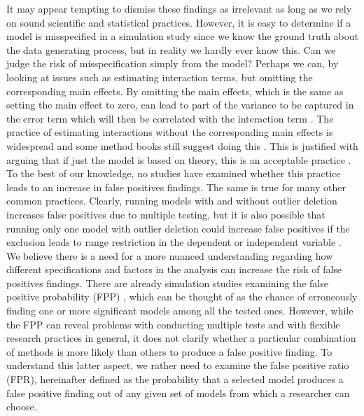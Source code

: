 It may appear tempting to dismiss these findings as irrelevant as long as we rely on sound scientific and statistical practices. However, it is easy to determine if a model is misspecified in a simulation study since we know the ground truth about the data generating process, but in reality we hardly ever know this. Can we judge the risk of misspecification simply from the model? Perhaps we can, by looking at issues such as estimating interaction terms, but omitting the corresponding main effects. By omitting the main effects, which is the same as setting the main effect to zero, can lead to part of the variance to be captured in the error term which will then be correlated with the interaction term \citep{Branbor2006}. The practice of estimating interactions without the corresponding main effects is widespread \citep{Branbor2006} and some method books still suggest doing this \citep{Cleves2008}. This is justified with arguing that if just the model is based on theory, this is an acceptable practice \citep{aiken1991multiple}. To the best of our knowledge, no studies have examined whether this practice leads to an increase in false positives findings. The same is true for many other common practices. Clearly, running models with and without outlier deletion increases false positives due to multiple testing, but it is also possible that running only one model with outlier deletion could increase false positives if the exclusion leads to range restriction in the dependent or independent variable \citep{Raju2003}. \\        

We believe there is a need for a more nuanced understanding regarding how different specifications and factors in the analysis can increase the risk of false positives findings. There are already simulation studies examining the false positive probability (FPP) \citep{Simmons2011}, which can be thought of as the chance of erroneously finding one or more significant models among all the tested ones. However, while the FPP can reveal problems with conducting multiple tests and with flexible research practices in general, it does not clarify whether a particular combination of methods is more likely than others to produce a false positive finding. To understand this latter aspect, we rather need to examine the false positive ratio (FPR), hereinafter defined as the probability that a selected model produces a false positive finding out of any given set of models from which a researcher can choose. \\

